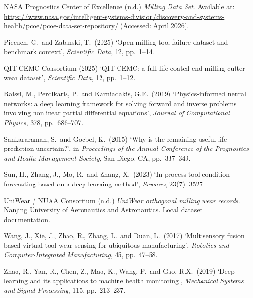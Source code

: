 \documentclass[11pt,a4paper]{article}
\begin{document}
NASA Prognostics Center of Excellence (n.d.) \emph{Milling Data Set}. Available at: \url{https://www.nasa.gov/intelligent-systems-division/discovery-and-systems-health/pcoe/pcoe-data-set-repository/} (Accessed: April 2026).

Piecuch, G.\ and Zabinski, T.\ (2025) `Open milling tool-failure dataset and benchmark context', \emph{Scientific Data}, 12, pp.~1--14.

QIT-CEMC Consortium (2025) `QIT-CEMC: a full-life coated end-milling cutter wear dataset', \emph{Scientific Data}, 12, pp.~1--12.

Raissi, M., Perdikaris, P.\ and Karniadakis, G.E.\ (2019) `Physics-informed neural networks: a deep learning framework for solving forward and inverse problems involving nonlinear partial differential equations', \emph{Journal of Computational Physics}, 378, pp.~686--707.

Sankararaman, S.\ and Goebel, K.\ (2015) `Why is the remaining useful life prediction uncertain?', in \emph{Proceedings of the Annual Conference of the Prognostics and Health Management Society}, San Diego, CA, pp.~337--349.

Sun, H., Zhang, J., Mo, R.\ and Zhang, X.\ (2023) `In-process tool condition forecasting based on a deep learning method', \emph{Sensors}, 23(7), 3527.

UniWear / NUAA Consortium (n.d.) \emph{UniWear orthogonal milling wear records}. Nanjing University of Aeronautics and Astronautics. Local dataset documentation.

Wang, J., Xie, J., Zhao, R., Zhang, L.\ and Duan, L.\ (2017) `Multisensory fusion based virtual tool wear sensing for ubiquitous manufacturing', \emph{Robotics and Computer-Integrated Manufacturing}, 45, pp.~47--58.

Zhao, R., Yan, R., Chen, Z., Mao, K., Wang, P.\ and Gao, R.X.\ (2019) `Deep learning and its applications to machine health monitoring', \emph{Mechanical Systems and Signal Processing}, 115, pp.~213--237.

\endgroup
\end{document}
